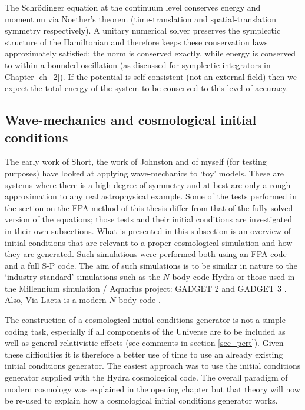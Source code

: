 The Schr\"odinger equation at the continuum level conserves energy and momentum via Noether's theorem (time-translation and spatial-translation symmetry respectively). A unitary numerical solver preserves the symplectic structure of the Hamiltonian and therefore keeps these conservation laws approximately satisfied: the norm is conserved exactly, while energy is conserved to within a bounded oscillation (as discussed for symplectic integrators in Chapter \ref{ch_2}). If the potential is self-consistent (not an external field) then we expect the total energy of the system to be conserved to this level of accuracy.

\subsection{Wave-mechanics and cosmological initial conditions}
\label{cos_init}
The early work of Short, the work of Johnston and of myself (for testing purposes) have looked at applying wave-mechanics to `toy' models. These are systems where there is a high degree of symmetry and at best are only a rough approximation to any real astrophysical example. Some of the tests performed in the section on the FPA method of this thesis differ from that of the fully solved version of the equations; those tests and their initial conditions are investigated in their own subsections. What is presented in this subsection is an overview of initial conditions that are relevant to a proper cosmological simulation and how they are generated. Such simulations were performed both using an FPA code and a full S-P code. The aim of such simulations is to be similar in nature to the `industry standard' simulations such as the $N$-body code Hydra \citep{bib_hmpc1} or those used in the Millennium simulation / Aquarius project: GADGET 2 \citep{bib_mil, bib_spr} and GADGET 3 \citep{bib_aqu}. Also, Via Lacta is a modern $N$-body code \citep{bib_via}.

The construction of a cosmological initial conditions generator is not a simple coding task, especially if all components of the Universe are to be included as well as general relativistic effects (see comments in section \ref{sec_pert}). Given these difficulties it is therefore a better use of time to use an already existing initial conditions generator. The easiest approach was to use the initial conditions generator supplied with the Hydra cosmological code. The overall paradigm of modern cosmology was explained in the opening chapter but that theory will now be re-used to explain how a cosmological initial conditions generator works.

